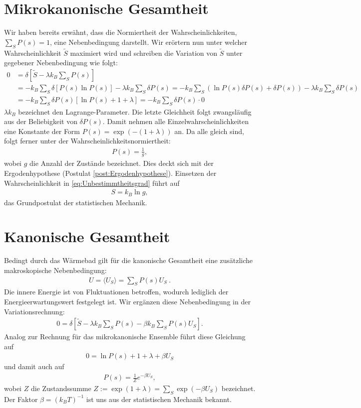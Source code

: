 \section{Mikrokanonische Gesamtheit}
Wir haben bereits erwähnt, dass die Normiertheit der Wahrscheinlichkeiten, $\sum_S P(s)=1$, eine Nebenbedingung darstellt.
Wir erörtern nun unter welcher Wahrscheinlichkeit $\widetilde{S}$ maximiert wird und schreiben die Variation von $\widetilde{S}$ unter gegebener Nebenbedingung wie folgt:
\begin{align*}
    0&=\delta [\widetilde{S}-\lambda k_B \sum_S P(s)]\\
    &=-k_B\sum_S \delta[P(s)\ln P(s)]-\lambda k_B \sum_S \delta P(s)=-k_B\sum_S (\ln P(s)\delta P(s)+\delta P(s))-\lambda k_B \sum_S \delta P(s)\\
    &=-k_B\sum_S \delta P(s)[\ln P(s)+1+\lambda]=-k_B\sum_S \delta P(s)\cdot 0
\end{align*}
$\lambda k_B$ bezeichnet den Lagrange-Parameter. Die letzte Gleichheit folgt zwangsläufig aus der Beliebigkeit von $\delta P(s)$. Damit nehmen alle Einzelwahrscheinlichkeiten eine Konstante der Form $P(s)=\exp(-(1+\lambda))$ an. Da alle gleich sind, folgt ferner unter der Wahrscheinlichkeitsnormiertheit:
\begin{align*}
    P(s)=\frac{1}{g},
\end{align*}
wobei $g$ die Anzahl der Zustände bezeichnet. Dies deckt sich mit der Ergodenhypothese (Postulat \ref{post:Ergodenhypothese}). 
Einsetzen der Wahrscheinlichkeit in \ref{eq:Unbestimmtheitsgrad} führt auf 
\begin{align*}
    S=k_B \ln g,
\end{align*}
das Grundpostulat der statistischen Mechanik.

\section{Kanonische Gesamtheit}
Bedingt durch das Wärmebad gilt für die kanonische Gesamtheit eine zusätzliche makroskopische Nebenbedingung:
\begin{align*}
    \boxed{U=\langle U_S \rangle=\sum_S P(s)U_S}\:.
\end{align*}
Die innere Energie ist von Fluktuationen betroffen, wodurch lediglich der Energieerwartungswert festgelegt ist. 
Wir ergänzen diese Nebenbedingung in der Variationsrechnung:
\begin{align*}
    0=\delta [\widetilde{S}-\lambda k_B \sum_S P(s)-\beta k_B \sum_S P(s)U_S].
\end{align*}
Analog zur Rechnung für das mikrokanonische Ensemble führt diese Gleichung auf
\begin{align*}
    0=\ln P(s) +1+\lambda+\beta U_S
\end{align*}
und damit auch auf
\begin{align*}
    P(s)=\frac{1}{Z}e^{-\beta U_S},
\end{align*}
wobei $Z$ die Zustandssumme $Z:=\exp(1+\lambda)=\sum_S\exp(-\beta U_S)$ bezeichnet. Der Faktor $\beta=(k_B T)^{-1}$ ist uns aus der statistischen Mechanik bekannt.

